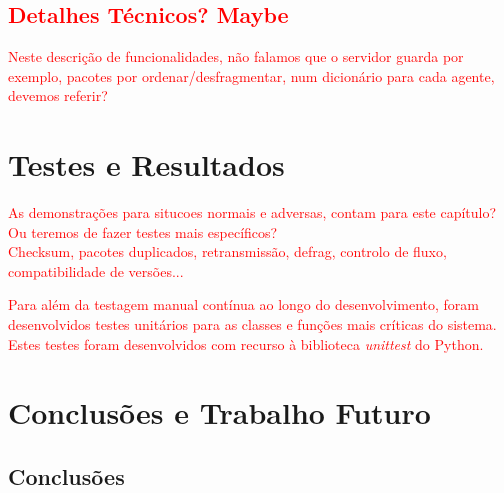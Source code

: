 \documentclass[a4paper,12pt]{scrreprt}
\begin{document}
\section{\textcolor{red}{Detalhes Técnicos? Maybe}}

\textcolor{red}{
    Neste descrição de funcionalidades, não falamos que o servidor guarda por exemplo,
    pacotes por ordenar/desfragmentar, num dicionário para cada agente, devemos referir?
}



\chapter{Testes e Resultados}

\textcolor{red}{
    As demonstrações para situcoes normais e adversas, contam para este capítulo?
    Ou teremos de fazer testes mais específicos? \\
    Checksum, pacotes duplicados, retransmissão, defrag, controlo de fluxo, compatibilidade de versões...
}

\textcolor{red}{
    Para além da testagem manual contínua ao longo do desenvolvimento, foram
    desenvolvidos testes unitários para as classes e funções mais críticas do
    sistema. Estes testes foram desenvolvidos com recurso à biblioteca
    \textit{unittest} do Python.
}



\chapter{Conclusões e Trabalho Futuro}

\section{Conclusões}
\end{document}
